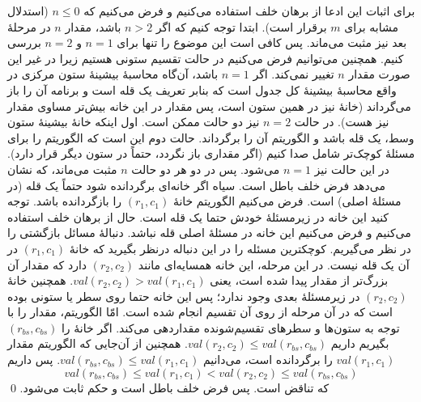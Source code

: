 	برای اثبات این ادعا از برهان خلف استفاده می‌کنیم و فرض می‌کنیم که $n \leq 0$  (استدلال مشابه برای $m$ برقرار است). ابتدا توجه کنیم که اگر $n > 2$   باشد، مقدار $n$ در مرحلۀ بعد نیز مثبت می‌ماند.  پس کافی است این موضوع را تنها برای
	 $n = 1$
	 و 
	 $n =2$
	بررسی کنیم. همچنین می‌توانیم فرض می‌کنیم در حالت تقسیم ستونی هستیم زیرا در غیر این صورت مقدار $n$ تغییر نمی‌کند. 
\renewcommand{\labelitemi}{{\scriptsize\textbullet{}} }
	اگر $n=1$  باشد، آن‌گاه محاسبۀ بیشینۀ ستون مرکزی در واقع محاسبۀ بیشینۀ کل جدول است که بنابر تعریف یک قله است و برنامه آن را باز می‌گرداند (خانۀ  نیز در همین ستون است، پس مقدار در این خانه بیش‌تر مساوی مقدار  نیز هست). 
	در حالت $n=2$ نیز  دو حالت ممکن است. اول اینکه خانۀ بیشینۀ ستون وسط، یک قله باشد و الگوریتم آن را برگرداند. حالت دوم این است که الگوریتم را برای مسئلۀ کوچک‌تر شامل  صدا کنیم (اگر مقداری باز نگردد،  حتماً در ستون دیگر قرار دارد). در این حالت نیز $n=1$ می‌شود.
	 پس در دو هر دو حالت $n$  مثبت می‌ماند، که نشان می‌دهد فرض خلف باطل است.
	‌سیاه{ اگر خانه‌ای برگردانده شود حتماً یک قله (در مسئلۀ اصلی) است.} فرض می‌کنیم الگوریتم خانۀ $(r_1, c_1)$ را بازگردانده باشد. توجه کنید این خانه در زیرمسئلۀ خودش حتما یک قله است. حال از برهان خلف استفاده می‌کنیم و فرض می‌کنیم این خانه در مسئلۀ اصلی قله نباشد.  دنبالۀ مسائل بازگشتی را در نظر می‌گیریم. کوچکترین مسئله را در این دنباله درنظر بگیرید که خانۀ $(r_1, c_1)$ در آن یک قله نیست. در این مرحله، این خانه همسایه‌ای مانند $(r_2, c_2)$ دارد که مقدار آن بزرگ‌تر از مقدار پیدا شده است، یعنی 
	$val(r_2, c_2) > val(r_1, c_1)$. همچنین خانۀ  
	$(r_2, c_2)$
	در زیرمسئلۀ بعدی وجود ندارد؛ پس این خانه حتما روی سطر یا ستونی بوده است که در آن مرحله از روی آن تقسیم انجام شده است. امّا الگوریتم، مقدار  را با توجه به ستون‌ها و سطر‌های تقسیم‌شونده مقداردهی می‌کند. اگر خانۀ  را $(r_{bs}, c_{bs})$ بگیریم داریم 
	$val(r_2, c_2) \leq val(r_{bs}, c_{bs})$.
	همچنین از آن‌جایی که الگوریتم مقدار  
	$val(r_1, c_1)$
	را برگردانده است، می‌دانیم 
		$val(r_{bs}, c_{bs}) \leq val(r_{1}, c_{1})$.
		پس داریم
		\begin{equation*}
			val(r_{bs}, c_{bs}) \leq val(r_1, c_1) < val(r_2,c_2) \leq val(r_{bs}, c_{bs})
		\end{equation*}
		که تناقض است. پس فرض خلف باطل است و حکم ثابت می‌شود. \qed
{}


